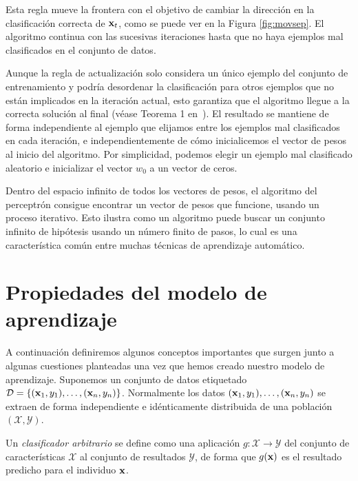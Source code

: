 \documentclass[oneside,openright,titlepage,numbers=noenddot,openany,headinclude,footinclude=true,
cleardoublepage=empty,abstractoff,BCOR=5mm,paper=a4,fontsize=12pt,main=spanish]{scrreprt}
\begin{document}
Esta regla mueve la frontera con el objetivo de cambiar la dirección en la clasificación correcta de $\textbf{x}_t$, como se puede ver en la Figura \ref{fig:movsep}. El algoritmo continua con las sucesivas iteraciones hasta que no haya ejemplos mal clasificados en el conjunto de datos.

Aunque la regla de actualización solo considera un único ejemplo del conjunto de entrenamiento y podría desordenar la clasificación para otros ejemplos que no están implicados en la iteración actual, esto garantiza que el algoritmo llegue a la correcta solución al final (véase Teorema 1 en~\cite{perceptronproof2012}). El resultado se mantiene de forma independiente al ejemplo que elijamos entre los ejemplos mal clasificados en cada iteración, e independientemente de cómo inicialicemos el vector de pesos al inicio del algoritmo. Por simplicidad, podemos elegir un ejemplo mal clasificado aleatorio e inicializar el vector $w_0$ a un vector de ceros.

Dentro del espacio infinito de todos los vectores de pesos, el algoritmo del perceptrón consigue encontrar un vector de pesos que funcione, usando un proceso iterativo. Esto ilustra como un algoritmo puede buscar un conjunto infinito de hipótesis usando un número finito de pasos, lo cual es una característica común entre muchas técnicas de aprendizaje automático.

\section{Propiedades del modelo de aprendizaje}

A continuación definiremos algunos conceptos importantes que surgen junto a algunas cuestiones planteadas una vez que hemos creado nuestro modelo de aprendizaje. Suponemos un conjunto de datos etiquetado $\mathcal{D}=\{(\textbf{x}_1,y_1),\dots,(\textbf{x}_n,y_n)\}$. Normalmente los datos $(\textbf{x}_1, y_1),\dots, (\textbf{x}_n, y_n)$ se extraen de forma independiente e idénticamente distribuida de una población $(\mathcal{X},\mathcal{Y})$.\\

\begin{definition}
Un \textit{clasificador arbitrario} se define como una aplicación $g\colon \mathcal{X} \to \mathcal{Y}$ del conjunto de características $\mathcal{X}$ al conjunto de resultados $\mathcal{Y}$, de forma que $ g(\textbf{x})$ es el resultado predicho para el individuo $\textbf{x}$.
\end{definition}
\end{document}
